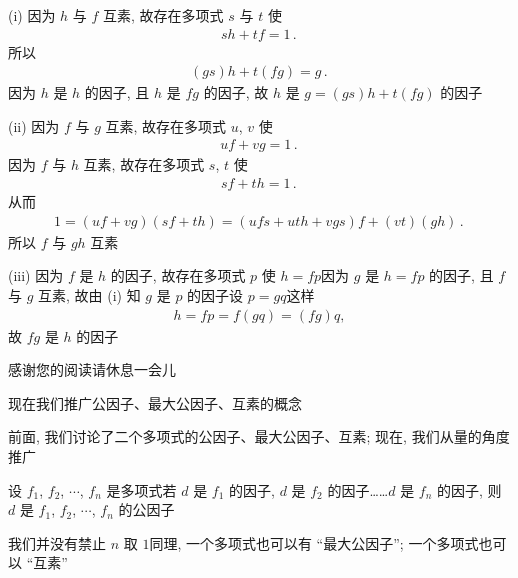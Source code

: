 \begin{pf}
    (i) 因为 $h$ 与 $f$ 互素, 故存在多项式 $s$ 与 $t$ 使
    \begin{align*}
        sh + tf = 1 \period
    \end{align*}
    所以
    \begin{align*}
        (gs)h + t(fg) = g \period
    \end{align*}
    因为 $h$ 是 $h$ 的因子, 且 $h$ 是 $fg$ 的因子, 故 $h$ 是 $g = (gs)h + t(fg)$ 的因子\period

    (ii) 因为 $f$ 与 $g$ 互素, 故存在多项式 $u$, $v$ 使
    \begin{align*}
        uf + vg = 1 \period
    \end{align*}
    因为 $f$ 与 $h$ 互素, 故存在多项式 $s$, $t$ 使
    \begin{align*}
        sf + th = 1 \period
    \end{align*}
    从而
    \begin{align*}
        1 = (uf + vg)(sf + th) = (ufs + uth + vgs)f + (vt)(gh) \period
    \end{align*}
    所以 $f$ 与 $gh$ 互素\period

    (iii) 因为 $f$ 是 $h$ 的因子, 故存在多项式 $p$ 使 $h = fp$\period 因为 $g$ 是 $h = fp$ 的因子, 且 $f$ 与 $g$ 互素, 故由 (i) 知 $g$ 是 $p$ 的因子\period 设 $p = gq$\period 这样
    \begin{align*}
        h = fp = f(gq) = (fg)q,
    \end{align*}
    故 $fg$ 是 $h$ 的因子\period
\end{pf}

感谢您的阅读\period 请休息一会儿\period

\myLine

现在我们推广公因子、最大公因子、互素的概念\period

前面, 我们讨论了二个多项式的公因子、最大公因子、互素; 现在, 我们从量的角度推广\period

\begin{definition}
    设 $f_1$, $f_2$, $\cdots$, $f_n$ 是多项式\period 若 $d$ 是 $f_1$ 的因子, $d$ 是 $f_2$ 的因子……$d$ 是 $f_n$ 的因子, 则 $d$ 是 $f_1$, $f_2$, $\cdots$, $f_n$ 的公因子\period
\end{definition}

\begin{remark}
    我们并没有禁止 $n$ 取 $1$\period 同理, 一个多项式也可以有 ``最大公因子''; 一个多项式也可以 ``互素''\period
\end{remark}

